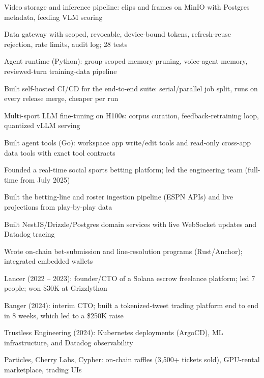 \documentclass[print]{jack-resume}
\begin{document}
\begin{tightemize}
    \item Video storage and inference pipeline: clips and frames on MinIO with Postgres metadata, feeding VLM scoring
    \item Data gateway with scoped, revocable, device-bound tokens, refresh-reuse rejection, rate limits, audit log; 28 tests
    \item Agent runtime (Python): group-scoped memory pruning, voice-agent memory, reviewed-turn training-data pipeline
    \item Built self-hosted CI/CD for the end-to-end suite: serial/parallel job split, runs on every release merge, cheaper per run
    \item Multi-sport LLM fine-tuning on H100s: corpus curation, feedback-retraining loop, quantized vLLM serving
    \item Built agent tools (Go): workspace app write/edit tools and read-only cross-app data tools with exact tool contracts
\end{tightemize}
\sectionsep

\begin{tightemize}
    \item Founded a real-time social sports betting platform; led the engineering team (full-time from July 2025)
    \item Built the betting-line and roster ingestion pipeline (ESPN APIs) and live projections from play-by-play data
    \item Built NestJS/Drizzle/Postgres domain services with live WebSocket updates and Datadog tracing
    \item Wrote on-chain bet-submission and line-resolution programs (Rust/Anchor); integrated embedded wallets
\end{tightemize}
\sectionsep

\begin{tightemize}
    \item Lancer (2022 – 2023): founder/CTO of a Solana escrow freelance platform; led 7 people; won \$30K at Grizzlython
    \item Banger (2024): interim CTO; built a tokenized-tweet trading platform end to end in 8 weeks, which led to a \$250K raise
    \item Trustless Engineering (2024): Kubernetes deployments (ArgoCD), ML infrastructure, and Datadog observability
    \item Particles, Cherry Labs, Cypher: on-chain raffles (3,500+ tickets sold), GPU-rental marketplace, trading UIs
\end{tightemize}
\sectionsep
\end{document}
